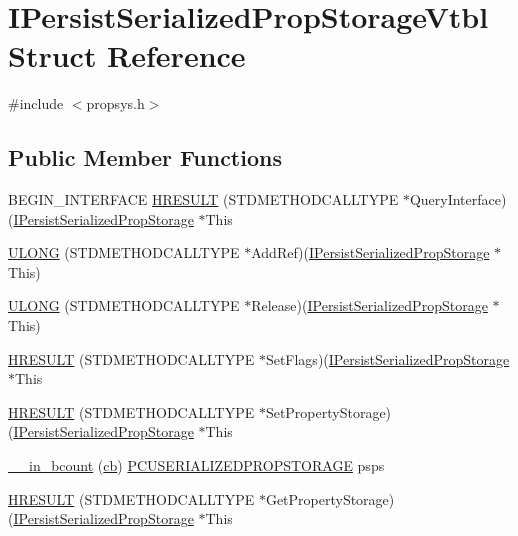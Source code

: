 \hypertarget{struct_i_persist_serialized_prop_storage_vtbl}{}\section{I\+Persist\+Serialized\+Prop\+Storage\+Vtbl Struct Reference}
\label{struct_i_persist_serialized_prop_storage_vtbl}


{\ttfamily \#include $<$propsys.\+h$>$}

\subsection*{Public Member Functions}
\begin{DoxyCompactItemize}
\item 
B\+E\+G\+I\+N\+\_\+\+I\+N\+T\+E\+R\+F\+A\+CE \hyperlink{struct_i_persist_serialized_prop_storage_vtbl_aad23ab4321c70eb14e064bc8ae1f8a43}{H\+R\+E\+S\+U\+LT} (S\+T\+D\+M\+E\+T\+H\+O\+D\+C\+A\+L\+L\+T\+Y\+PE $\ast$Query\+Interface)(\hyperlink{propsys_8h_a4638431559c19024002c0f0a890376e3}{I\+Persist\+Serialized\+Prop\+Storage} $\ast$This
\item 
\hyperlink{struct_i_persist_serialized_prop_storage_vtbl_a73b3092f52b7b39a95b6d5b17496bfc4}{U\+L\+O\+NG} (S\+T\+D\+M\+E\+T\+H\+O\+D\+C\+A\+L\+L\+T\+Y\+PE $\ast$Add\+Ref)(\hyperlink{propsys_8h_a4638431559c19024002c0f0a890376e3}{I\+Persist\+Serialized\+Prop\+Storage} $\ast$This)
\item 
\hyperlink{struct_i_persist_serialized_prop_storage_vtbl_a72ad84b88ded6e6a9aaa79bf3da41cd3}{U\+L\+O\+NG} (S\+T\+D\+M\+E\+T\+H\+O\+D\+C\+A\+L\+L\+T\+Y\+PE $\ast$Release)(\hyperlink{propsys_8h_a4638431559c19024002c0f0a890376e3}{I\+Persist\+Serialized\+Prop\+Storage} $\ast$This)
\item 
\hyperlink{struct_i_persist_serialized_prop_storage_vtbl_a696df6e28ed40f4693656125ba2c2de9}{H\+R\+E\+S\+U\+LT} (S\+T\+D\+M\+E\+T\+H\+O\+D\+C\+A\+L\+L\+T\+Y\+PE $\ast$Set\+Flags)(\hyperlink{propsys_8h_a4638431559c19024002c0f0a890376e3}{I\+Persist\+Serialized\+Prop\+Storage} $\ast$This
\item 
\hyperlink{struct_i_persist_serialized_prop_storage_vtbl_a858a9aee6fe2dcd8ec71e2b5ed383aee}{H\+R\+E\+S\+U\+LT} (S\+T\+D\+M\+E\+T\+H\+O\+D\+C\+A\+L\+L\+T\+Y\+PE $\ast$Set\+Property\+Storage)(\hyperlink{propsys_8h_a4638431559c19024002c0f0a890376e3}{I\+Persist\+Serialized\+Prop\+Storage} $\ast$This
\item 
\hyperlink{struct_i_persist_serialized_prop_storage_vtbl_aa802b7c6c00d6d0fda467072701092ea}{\+\_\+\+\_\+in\+\_\+bcount} (\hyperlink{struct_i_persist_serialized_prop_storage_vtbl_ab316f88cbbf87f4e4737aef460bbf94e}{cb}) \hyperlink{propsys_8h_a215d1a30f0828b8534ed0e566b333527}{P\+C\+U\+S\+E\+R\+I\+A\+L\+I\+Z\+E\+D\+P\+R\+O\+P\+S\+T\+O\+R\+A\+GE} psps
\item 
\hyperlink{struct_i_persist_serialized_prop_storage_vtbl_ac691fcc59e9cae507c35a97ca903ef4d}{H\+R\+E\+S\+U\+LT} (S\+T\+D\+M\+E\+T\+H\+O\+D\+C\+A\+L\+L\+T\+Y\+PE $\ast$Get\+Property\+Storage)(\hyperlink{propsys_8h_a4638431559c19024002c0f0a890376e3}{I\+Persist\+Serialized\+Prop\+Storage} $\ast$This
\end{DoxyCompactItemize}
